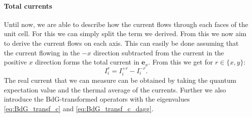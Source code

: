 \documentclass[../main.tex]{subfile}
\begin{document}
\paragraph{Total currents}
Until now, we are able to describe how the current flows through each faces of the unit cell. For this we can simply split the term we derived.
From this we now aim to derive the current flows on each axis.
This can easily be done assuming that the current flowing in the $-x$ direction subtracted from the current in the positive $x$ direction forms the total current in $\bm{e}_x$.
From this we get for $r\in\{x,y\}$:
\[
    I_{i}^{r} = I_{i}^{+r} - I_{i}^{-r}.
\]
The real current that we can measure can be obtained by taking the quantum expectation value and the thermal average of the currents. Further we also introduce the 
BdG-transformed operators with the eigenvalues \ref{eq:BdG_transf_c} and \ref{eq:BdG_transf_c_dagg}. \\
\end{document}
